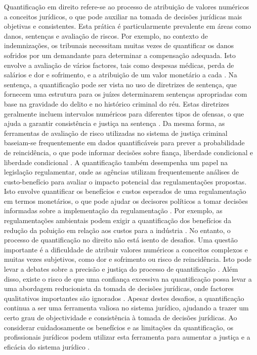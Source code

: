 \begin{agradecimentos}
    Quantificação em direito refere-se ao processo de atribuição de valores numéricos a conceitos jurídicos, o que pode auxiliar na tomada de decisões jurídicas mais objetivas e consistentes. Esta prática é particularmente prevalente em áreas como danos, sentenças e avaliação de riscos. Por exemplo, no contexto de indemnizações, os tribunais necessitam muitas vezes de quantificar os danos sofridos por um demandante para determinar a compensação adequada. Isto envolve a avaliação de vários factores, tais como despesas médicas, perda de salários e dor e sofrimento, e a atribuição de um valor monetário a cada \cite{damages_quantification}. Na sentença, a quantificação pode ser vista no uso de diretrizes de sentença, que fornecem uma estrutura para os juízes determinarem sentenças apropriadas com base na gravidade do delito e no histórico criminal do réu. Estas diretrizes geralmente incluem intervalos numéricos para diferentes tipos de ofensas, o que ajuda a garantir consistência e justiça na sentença \cite{sentencing_guidelines}. Da mesma forma, as ferramentas de avaliação de risco utilizadas no sistema de justiça criminal baseiam-se frequentemente em dados quantificáveis para prever a probabilidade de reincidência, o que pode informar decisões sobre fiança, liberdade condicional e liberdade condicional \cite{risk_assessment}. A quantificação também desempenha um papel na legislação regulamentar, onde as agências utilizam frequentemente análises de custo-benefício para avaliar o impacto potencial das regulamentações propostas. Isto envolve quantificar os benefícios e custos esperados de uma regulamentação em termos monetários, o que pode ajudar os decisores políticos a tomar decisões informadas sobre a implementação da regulamentação \cite{cost_benefit_análise}. Por exemplo, as regulamentações ambientais podem exigir a quantificação dos benefícios da redução da poluição em relação aos custos para a indústria \cite{regulação_ambiental}. No entanto, o processo de quantificação no direito não está isento de desafios. Uma questão importante é a dificuldade de atribuir valores numéricos a conceitos complexos e muitas vezes subjetivos, como dor e sofrimento ou risco de reincidência. Isto pode levar a debates sobre a precisão e justiça do processo de quantificação \cite{quantification_challenges}. Além disso, existe o risco de que uma confiança excessiva na quantificação possa levar a uma abordagem reducionista da tomada de decisões jurídicas, onde factores qualitativos importantes são ignorados \cite{reductionist_approach}. Apesar destes desafios, a quantificação continua a ser uma ferramenta valiosa no sistema jurídico, ajudando a trazer um certo grau de objectividade e consistência à tomada de decisões jurídicas. Ao considerar cuidadosamente os benefícios e as limitações da quantificação, os profissionais jurídicos podem utilizar esta ferramenta para aumentar a justiça e a eficácia do sistema jurídico \cite{quantification_value}. 
    

\end{agradecimentos}
